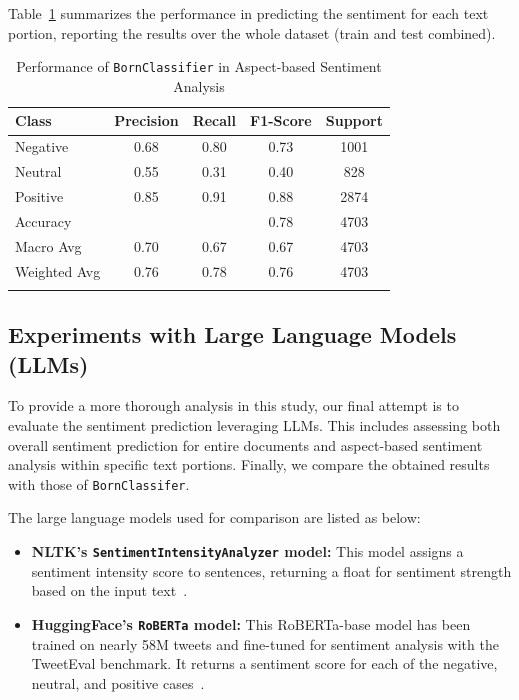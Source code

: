 Table~\ref{tab:born_aspect_based} summarizes the performance in predicting the sentiment for each text portion, reporting the results over the whole dataset (train and test combined).

\begin{table}[h]
\caption{Performance of \texttt{BornClassifier} in Aspect-based Sentiment Analysis}\label{tab:born_aspect_based}%
\begin{tabular*}{\textwidth}{@{\extracolsep{\fill}}lcccc}
\toprule
Class & Precision & Recall & F1-Score & Support \\
\midrule
Negative & 0.68 & 0.80 & 0.73 & 1001 \\
Neutral & 0.55 & 0.31 & 0.40 & 828 \\
Positive & 0.85 & 0.91 & 0.88 & 2874 \\
\midrule
Accuracy & & & 0.78 & 4703 \\
Macro Avg & 0.70 & 0.67 & 0.67 & 4703 \\
Weighted Avg & 0.76 & 0.78 & 0.76 & 4703 \\
\botrule
\end{tabular*}
\end{table}


\subsection{Experiments with Large Language Models (LLMs)}\label{section:llms}

To provide a more thorough analysis in this study, our final attempt is to evaluate the sentiment prediction leveraging LLMs. This includes assessing both overall sentiment prediction for entire documents and aspect-based sentiment analysis within specific text portions. Finally, we compare the obtained results with those of \texttt{BornClassifer}.

The large language models used for comparison are listed as below:
\begin{itemize}
    \item \textbf{NLTK's \texttt{SentimentIntensityAnalyzer} model:} This model assigns a sentiment intensity score to sentences, returning a float for sentiment strength based on the input text~\cite{llm_nltk}.

    \item \textbf{HuggingFace's \texttt{RoBERTa} model:} This RoBERTa-base model has been trained on nearly 58M tweets and fine-tuned for sentiment analysis with the TweetEval benchmark. It returns a sentiment score for each of the negative, neutral, and positive cases~\cite{llm_roberta}.
\end{itemize}

